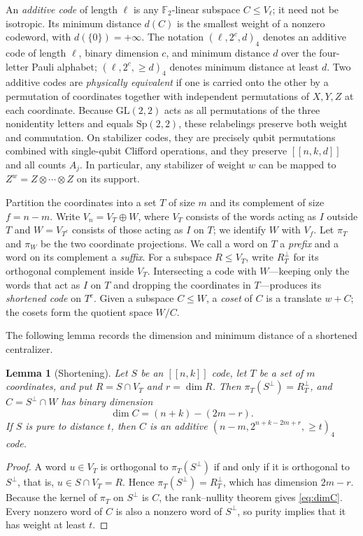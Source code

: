 \documentclass[11pt]{article}
\newtheorem{lemma}[theorem]{Lemma}
\theoremstyle{definition}
\theoremstyle{remark}
\newcommand{\F}{\mathbb F_2}
\newcommand{\qc}[1]{[\![#1]\!]}
\begin{document}
An \emph{additive code} of length \(\ell\) is any \(\F\)-linear
subspace \(C\leq V_\ell\); it need not be isotropic. Its minimum
distance \(d(C)\) is the smallest weight of a nonzero codeword, with
\(d(\{0\})=+\infty\). The notation \((\ell,2^c,d)_4\) denotes an
additive code of length \(\ell\), binary dimension \(c\), and minimum
distance \(d\) over the four-letter Pauli alphabet;
\((\ell,2^c,{\geq}d)_4\) denotes minimum distance at least \(d\). Two
additive codes are \emph{physically equivalent} if one is carried onto
the other by a permutation of coordinates together with independent
permutations of \(X,Y,Z\) at each coordinate. Because
\(\mathrm{GL}(2,2)\) acts as all permutations of the three nonidentity
letters and equals \(\mathrm{Sp}(2,2)\), these relabelings preserve both
weight and commutation. On stabilizer codes, they are precisely qubit
permutations combined with single-qubit Clifford operations, and they
preserve \(\qc{n,k,d}\) and all counts \(A_j\). In particular, any
stabilizer of weight \(w\) can be mapped to
\(Z^w=Z\otimes\cdots\otimes Z\) on its support.

Partition the coordinates into a set \(T\) of size \(m\) and its
complement of size \(f=n-m\). Write \(V_n=V_T\oplus W\), where \(V_T\)
consists of the words acting as \(I\) outside \(T\) and \(W=V_{T^c}\)
consists of those acting as \(I\) on \(T\); we identify \(W\) with
\(V_f\). Let \(\pi_T\) and \(\pi_W\) be the two coordinate projections.
We call a word on \(T\) a \emph{prefix} and a word on its complement a
\emph{suffix}. For a subspace \(R\leq V_T\), write \(R_T^\perp\) for its
orthogonal complement inside \(V_T\). Intersecting a code with
\(W\)---keeping only the words that act as \(I\) on \(T\) and dropping
the coordinates in \(T\)---produces its \emph{shortened code} on
\(T^c\). Given a subspace \(C\leq W\), a \emph{coset} of \(C\) is a
translate \(w+C\); the cosets form the quotient space \(W/C\).

The following lemma records the dimension and minimum distance of a
shortened centralizer.

\begin{lemma}[Shortening]\label{lem:shorten}
Let \(S\) be an \(\qc{n,k}\) code, let \(T\) be a set of \(m\)
coordinates, and put \(R=S\cap V_T\) and \(r=\dim R\). Then
\(\pi_T(S^\perp)=R_T^\perp\), and \(C=S^\perp\cap W\) has binary
dimension
\begin{equation}\label{eq:dimC}
 \dim C=(n+k)-(2m-r).
\end{equation}
If \(S\) is pure to distance \(t\), then \(C\) is an additive
\((n-m,2^{n+k-2m+r},{\geq}t)_4\) code.
\end{lemma}
\begin{proof}
A word \(u\in V_T\) is orthogonal to \(\pi_T(S^\perp)\) if and only if
it is orthogonal to \(S^\perp\), that is, \(u\in S\cap V_T=R\). Hence
\(\pi_T(S^\perp)=R_T^\perp\), which has dimension \(2m-r\). Because the
kernel of \(\pi_T\) on \(S^\perp\) is \(C\), the rank--nullity theorem
gives \eqref{eq:dimC}. Every nonzero word of \(C\) is also a nonzero
word of \(S^\perp\), so purity implies that it has weight at least
\(t\).
\end{proof}
\end{document}
